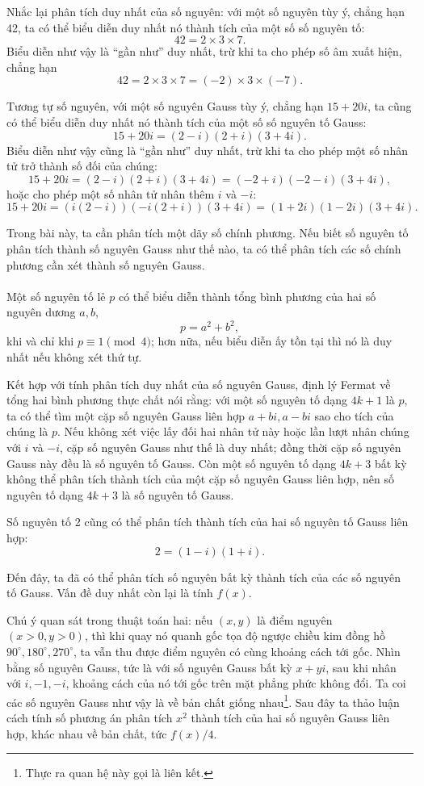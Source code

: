 \documentclass[11pt]{article}
\begin{document}
Nhắc lại phân tích duy nhất của số nguyên: với một số nguyên tùy ý, chẳng hạn
42, ta có thể biểu diễn duy nhất nó thành tích của một số số nguyên tố:
\[
  42=2\times3\times7.
\]
Biểu diễn như vậy là ``gần như'' duy nhất, trừ khi ta cho phép số âm xuất
hiện, chẳng hạn
\[
  42=2\times3\times7=(-2)\times3\times(-7).
\]

Tương tự số nguyên, với một số nguyên Gauss tùy ý, chẳng hạn \(15+20i\), ta
cũng có thể biểu diễn duy nhất nó thành tích của một số số nguyên tố Gauss:
\[
  15+20i=(2-i)(2+i)(3+4i).
\]
Biểu diễn như vậy cũng là ``gần như'' duy nhất, trừ khi ta cho phép một số
nhân tử trở thành số đối của chúng:
\[
  15+20i=(2-i)(2+i)(3+4i)=(-2+i)(-2-i)(3+4i),
\]
hoặc cho phép một số nhân tử nhân thêm \(i\) và \(-i\):
\[
  15+20i=(i(2-i))(-i(2+i))(3+4i)=(1+2i)(1-2i)(3+4i).
\]

Trong bài này, ta cần phân tích một dãy số chính phương. Nếu biết số nguyên tố
phân tích thành số nguyên Gauss như thế nào, ta có thể phân tích các số chính
phương cần xét thành số nguyên Gauss.

\paragraph{}
Một số nguyên tố lẻ \(p\) có thể biểu diễn thành tổng bình phương của hai số
nguyên dương \(a,b\),
\[
  p=a^2+b^2,
\]
khi và chỉ khi \(p\equiv1\pmod4\); hơn nữa, nếu biểu diễn ấy tồn tại thì nó
là duy nhất nếu không xét thứ tự.

Kết hợp với tính phân tích duy nhất của số nguyên Gauss, định lý Fermat về
tổng hai bình phương thực chất nói rằng: với một số nguyên tố dạng \(4k+1\)
là \(p\), ta có thể tìm một cặp số nguyên Gauss liên hợp \(a+bi,a-bi\) sao
cho tích của chúng là \(p\). Nếu không xét việc lấy đối hai nhân tử này hoặc
lần lượt nhân chúng với \(i\) và \(-i\), cặp số nguyên Gauss như thế là duy
nhất; đồng thời cặp số nguyên Gauss này đều là số nguyên tố Gauss. Còn một số
nguyên tố dạng \(4k+3\) bất kỳ không thể phân tích thành tích của một cặp số
nguyên Gauss liên hợp, nên số nguyên tố dạng \(4k+3\) là số nguyên tố Gauss.

Số nguyên tố 2 cũng có thể phân tích thành tích của hai số nguyên tố Gauss
liên hợp:
\[
  2=(1-i)(1+i).
\]

Đến đây, ta đã có thể phân tích số nguyên bất kỳ thành tích của các số nguyên
tố Gauss. Vấn đề duy nhất còn lại là tính \(f(x)\).

Chú ý quan sát trong thuật toán hai: nếu \((x,y)\) là điểm nguyên
\((x>0,y>0)\), thì khi quay nó quanh gốc tọa độ ngược chiều kim đồng hồ
\(90^\circ,180^\circ,270^\circ\), ta vẫn thu được điểm nguyên có cùng khoảng
cách tới gốc. Nhìn bằng số nguyên Gauss, tức là với số nguyên Gauss bất kỳ
\(x+yi\), sau khi nhân với \(i,-1,-i\), khoảng cách của nó tới gốc trên mặt
phẳng phức không đổi. Ta coi các số nguyên Gauss như vậy là về bản chất giống
nhau\footnote{Thực ra quan hệ này gọi là liên kết.}. Sau đây ta thảo luận cách
tính số phương án phân tích \(x^2\) thành tích của hai số nguyên Gauss liên
hợp, khác nhau về bản chất, tức \(f(x)/4\).
\end{document}

